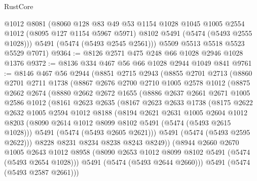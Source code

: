 \begin{lexlean}{RustCore}
\begin{coremodule}
        @1012
        @8081
        (@8060
          @128
          @83
          @49
          @53
          @1154
          @1028
          @1045
          @1005
          @2554
          @1012
          (@8095 @127 @1154 @5967 @5971)
          @8102
          @5491
          (@5474 (@5493 @2555 @1028)))
        @5491
        (@5474 (@5493 @2545 @2561)))
      @5509
      @5513
      @5518
      @5523
      @5529
      @7071)
@9364 := @8126 @2571 @475 @248 @66 @1028 @2946 @1028 @1376
@9372 := @8136 @334 @467 @56 @66 @1028 @2944 @1049 @841
@9761 := @8146
    @467
    @56
    @2944
    (@8851
      @2715
      @2943
      (@8855
        @2701
        @2713
        (@8860
          @2701
          @2711
          @1738
          (@8867
            @2676
            @2700
            @2710
            @1005
            @2578
            @1012
            (@8875
              @2662
              @2674
              (@8880
                @2662
                @2672
                @1655
                (@8886
                  @2637
                  @2661
                  @2671
                  @1005
                  @2586
                  @1012
                  (@8161
                    @2623
                    @2635
                    (@8167
                      @2623
                      @2633
                      @1738
                      (@8175
                        @2622
                        @2632
                        @1005
                        @2594
                        @1012
                        @8188
                        (@8194
                          @2621
                          @2631
                          @1005
                          @2604
                          @1012
                          @8203
                          (@8090 @2614 @1012 @8099 @8102 @5491 (@5474 (@5493 @2615 @1028)))
                          @5491
                          (@5474 (@5493 @2605 @2621)))
                        @5491
                        (@5474 (@5493 @2595 @2622)))
                      @8228
                      @8231
                      @8234
                      @8238
                      @8243
                      @8249))
                  (@8944
                    @2660
                    @2670
                    @1005
                    @2643
                    @1012
                    @8958
                    (@8090 @2653 @1012 @8099 @8102 @5491 (@5474 (@5493 @2654 @1028)))
                    @5491
                    (@5474 (@5493 @2644 @2660)))
                  @5491
                  (@5474 (@5493 @2587 @2661)))

\end{coremodule}
\end{lexlean}
